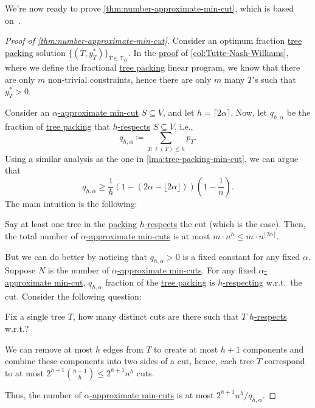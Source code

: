 We're now ready to prove \autoref{thm:number-approximate-min-cut}, which is based on~\cite{chekuri2020lp}.

\begin{proof}[Proof of \autoref{thm:number-approximate-min-cut}]
	Consider an optimum fraction \hyperref[prb:TP]{tree packing} solution \(\{ (T, y_T^{\ast} ) \}_{T \in \mathcal{T} _G} \). In the \hyperref[pf:col:Tutte-Nash-Williams]{proof} of \autoref{col:Tutte-Nash-Williams}, where we define the fractional \hyperref[prb:TP]{tree packing} linear program, we know that there are only \(m\) non-trivial constraints, hence there are only \(m\) many \(T\)'s such that \(y^{\ast} _T > 0\).

	Consider an \hyperref[def:approximate-min-cut]{\(\alpha \)-approximate min-cut} \(S \subseteq V\), and let \(h = \lceil 2 \alpha \rceil \). Now, let \(q_{h, \alpha }\) be the fraction of \hyperref[prb:TP]{tree packing} that \hyperref[def:respect]{\(h\)-respects} \(S \subseteq V\), i.e.,
	\[
		q_{h, \alpha }
		\coloneqq \sum_{T \colon \ell (T) \leq h} p_T.
	\]
	Using a similar analysis as the one in \autoref{lma:tree-packing-min-cut}, we can argue that
	\[
		q_{h, \alpha }
		\geq \frac{1}{h} (1 - (2\alpha - \lfloor 2 \alpha \rfloor )) \left( 1 - \frac{1}{n} \right) .
	\]
	The main intuition is the following:

	\begin{intuition}
		Say at least one tree in the \hyperref[prb:TP]{packing} \hyperref[def:respect]{\(h\)-respects} the cut (which is the case). Then, the total number of \hyperref[def:approximate-min-cut]{\(\alpha \)-approximate min-cuts} is at most \(m \cdot n^h \leq m \cdot n ^{\lfloor 2 \alpha \rfloor }\).
	\end{intuition}

	But we can do better by noticing that \(q_{h, \alpha } > 0\) is a fixed constant for any fixed \(\alpha \). Suppose \(N\) is the number of \hyperref[def:approximate-min-cut]{\(\alpha \)-approximate min-cuts}. For any fixed \hyperref[def:approximate-min-cut]{\(\alpha \)-approximate min-cut}, \(q_{h, \alpha }\) fraction of the \hyperref[prb:TP]{tree packing} is \hyperref[def:respect]{\(h\)-respecting} w.r.t.\ the cut. Consider the following question:

	\begin{problem*}
		Fix a single tree \(T\), how many distinct cuts are there such that \(T\) \hyperref[def:respect]{\(h\)-respects} w.r.t.?
	\end{problem*}
	\begin{answer}
		We can remove at most \(h\) edges from \(T\) to create at most \(h + 1\) components and combine these components into two sides of a cut, hence, each tree \(T\) correspond to at most \(2^{h+1} \binom{n-1}{h} \leq 2^{h+1} n^h\) cuts.
	\end{answer}

	Thus, the number of \hyperref[def:approximate-min-cut]{\(\alpha \)-approximate min-cuts} is at most \(2^{h+1} n^h / q_{h, \alpha }\).
\end{proof}